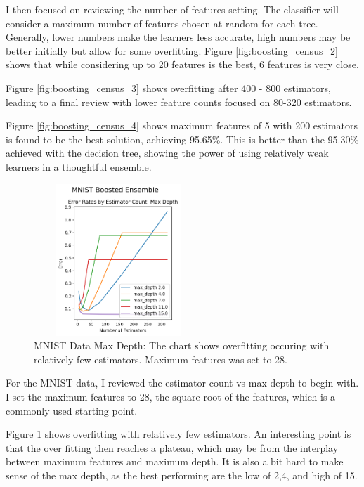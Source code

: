 \documentclass[letterpaper]{article} %
\begin{document}
I then focused on reviewing the number of features setting.  The classifier will consider a maximum number of features chosen at random for each tree.  Generally, lower numbers make the learners less accurate, high numbers may be better initially but allow for some overfitting. Figure \ref{fig:boosting_census_2}  shows that while considering up to 20 features is the best, 6 features is very close.

Figure \ref{fig:boosting_census_3}  shows overfitting after 400 - 800 estimators, leading to a final review with lower feature counts focused on 80-320 estimators.

Figure \ref{fig:boosting_census_4}  shows maximum features of 5 with 200 estimators is found to be the best solution, achieving  95.65\%.  This is better than the 95.30\% achieved with the decision tree, showing the power of using relatively weak learners in a thoughtful ensemble.

\begin{figure}[h]
\centering
\includegraphics[width=2.5in, height=2.25in]{figures/MNIST_Boosted_Ensemble_boosting_1.png}
\caption{MNIST Data Max Depth:  The chart shows overfitting occuring with relatively few estimators.  Maximum features was set to 28.  }
\label{fig:boosting_mnist_1}
\end{figure}

For the MNIST data, I reviewed the estimator count vs max depth to begin with.  I set the maximum features to 28, the square root of the features, which is a commonly used starting point.

Figure \ref{fig:boosting_mnist_1}  shows overfitting with relatively few estimators.  An interesting point is that the over fitting then reaches a plateau, which may be from the interplay between maximum features and maximum depth.  It is also a bit hard to make sense of the max depth, as the best performing are the low of 2,4, and high of 15. 
\end{document}

